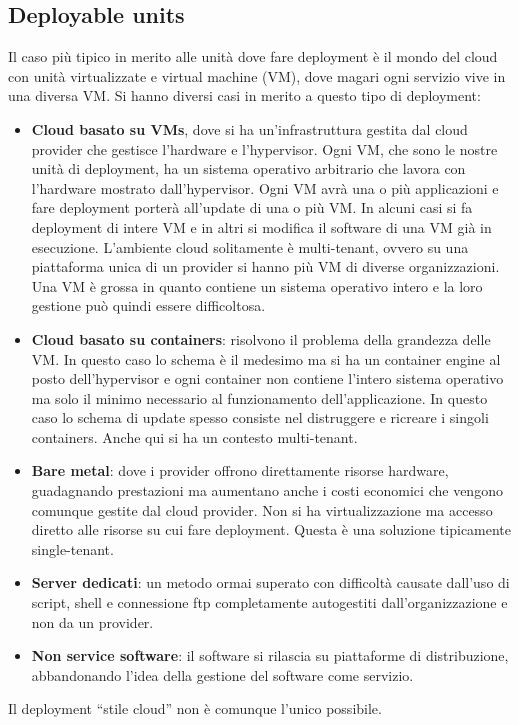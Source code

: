 \subsection{Deployable units}
Il caso più tipico in merito alle unità dove fare deployment è il mondo del cloud
con unità virtualizzate e virtual machine (VM), dove magari ogni servizio vive in
una diversa VM. Si hanno diversi casi in merito a questo tipo di deployment:
\begin{itemize}
      \item \textbf{Cloud basato su VMs}, dove si ha un'infrastruttura gestita
            dal cloud provider che gestisce l'hardware e l'hypervisor. Ogni VM,
            che sono le nostre unità di deployment, ha un sistema operativo
            arbitrario che lavora con l'hardware mostrato dall'hypervisor. Ogni
            VM avrà una o più applicazioni e fare deployment porterà all'update
            di una o più VM. In alcuni casi si fa deployment di intere VM e in
            altri si modifica il software di una VM già in esecuzione. L'ambiente
            cloud solitamente è multi-tenant, ovvero su una piattaforma unica di
            un provider si hanno più VM di diverse organizzazioni.
            Una VM è grossa in quanto contiene un sistema operativo intero e la
            loro gestione può quindi essere difficoltosa.
      \item \textbf{Cloud basato su containers}: risolvono il problema della
            grandezza delle VM. In questo caso lo schema è il medesimo ma si ha
            un container engine al posto dell'hypervisor e ogni container non
            contiene l'intero sistema operativo ma solo il minimo necessario al
            funzionamento dell'applicazione. In questo caso lo schema di update
            spesso consiste nel distruggere e ricreare i singoli containers.
            Anche qui si ha un contesto multi-tenant.
      \item \textbf{Bare metal}: dove i provider offrono direttamente risorse
            hardware, guadagnando prestazioni ma aumentano anche i costi economici
            che vengono comunque gestite dal cloud provider. Non si ha
            virtualizzazione ma accesso diretto alle risorse su cui fare
            deployment. Questa è una soluzione tipicamente single-tenant.
      \item \textbf{Server dedicati}: un metodo ormai superato con difficoltà
            causate dall'uso di script, shell e connessione ftp completamente 
            autogestiti dall'organizzazione e non da un provider.
      \item \textbf{Non service software}: il software si rilascia su piattaforme
            di distribuzione, abbandonando l'idea della gestione del software
            come servizio.
\end{itemize}
Il deployment “stile cloud” non è comunque l'unico possibile.
